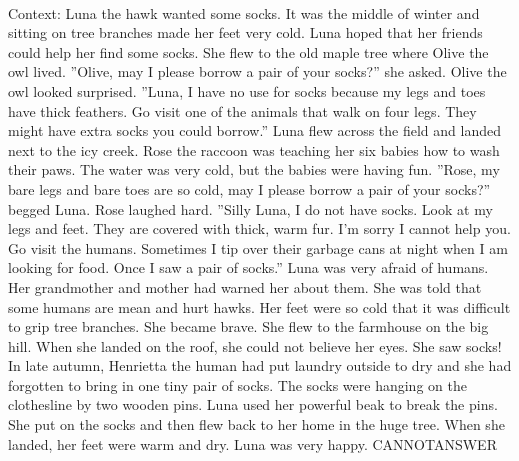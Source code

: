 \documentclass[11pt,a4paper, onecolumn]{article}
\begin{document}
\\ Context: Luna the hawk wanted some socks. It was the middle of winter and sitting on tree branches made her feet very cold. Luna hoped that her friends could help her find some socks. She flew to the old maple tree where Olive the owl lived. ''Olive, may I please borrow a pair of your socks?'' she asked. Olive the owl looked surprised. ''Luna, I have no use for socks because my legs and toes have thick feathers. Go visit one of the animals that walk on four legs. They might have extra socks you could borrow.'' Luna flew across the field and landed next to the icy creek. Rose the raccoon was teaching her six babies how to wash their paws. The water was very cold, but the babies were having fun. ''Rose, my bare legs and bare toes are so cold, may I please borrow a pair of your socks?'' begged Luna. Rose laughed hard. ''Silly Luna, I do not have socks. Look at my legs and feet. They are covered with thick, warm fur. I'm sorry I cannot help you. Go visit the humans. Sometimes I tip over their garbage cans at night when I am looking for food. Once I saw a pair of socks.'' Luna was very afraid of humans. Her grandmother and mother had warned her about them. She was told that some humans are mean and hurt hawks. Her feet were so cold that it was difficult to grip tree branches. She became brave. She flew to the farmhouse on the big hill. When she landed on the roof, she could not believe her eyes. She saw socks! In late autumn, Henrietta the human had put laundry outside to dry and she had forgotten to bring in one tiny pair of socks. The socks were hanging on the clothesline by two wooden pins. Luna used her powerful beak to break the pins. She put on the socks and then flew back to her home in the huge tree. When she landed, her feet were warm and dry. Luna was very happy. CANNOTANSWER
\end{document}

